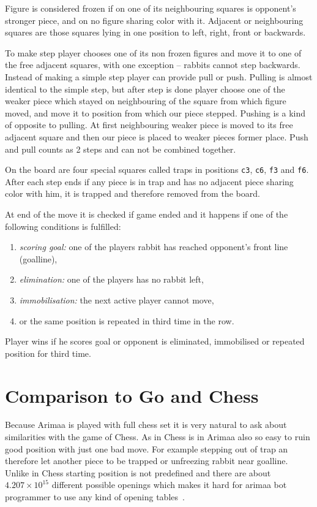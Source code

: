 Figure is considered frozen if on one of its neighbouring squares is opponent's
stronger piece, and on no figure sharing color with it. Adjacent or neighbouring
squares are those squares lying in one position to left, right, front or
backwards.


To make step player chooses one of its non frozen figures and move it to one of
the free adjacent squares, with one exception -- rabbits cannot step backwards.
Instead of making a simple step player can provide pull or push. Pulling is
almost identical to the simple step, but after step is done player choose one
of the weaker piece which stayed on neighbouring of the square from which
figure moved, and move it to position from which our piece stepped. Pushing is
a kind of opposite to pulling. At first neighbouring weaker piece is moved to
its free adjacent square and then our piece is placed to weaker pieces former
place. Push and pull counts as 2 steps and can not be combined together.

On the board are four special squares called traps in positions \texttt{c3},
\texttt{c6}, \texttt{f3} and \texttt{f6}. After each step ends if any piece is
in trap and has no adjacent piece sharing color with him, it is trapped and
therefore removed from the board.

At end of the move it is checked if game ended and it happens if one of the
following conditions is fulfilled:
\begin{enumerate}
\item \emph{scoring goal:} one of the players rabbit has reached opponent's front line (goalline),
\item \emph{elimination:} one of the players has no rabbit left,
\item \emph{immobilisation:} the next active player cannot move,
\item or the same position is repeated in third time in the row.
\end{enumerate}

Player wins if he scores goal or opponent is eliminated, immobilised or
repeated position for third time.


\section{Comparison to Go and Chess}
Because Arimaa is played with full chess set it is very natural to ask about
similarities with the game of Chess. As in Chess is in Arimaa also so easy to
ruin good position with just one bad move. For example stepping out of trap an
therefore let another piece to be trapped or unfreezing rabbit near goalline.
Unlike in Chess starting position is not predefined and there are about
$4.207\times10^{15}$ different possible openings which makes it hard for arimaa
bot programmer to use any kind of opening tables~\cite{COX}.

